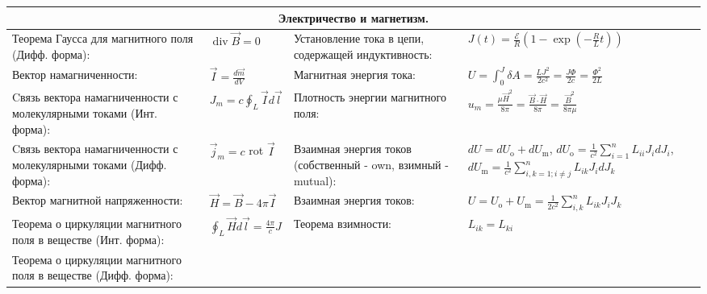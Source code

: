 \documentclass{article}
\begin{document}
\newpage

\begin{tabular}{ |p{6cm}|p{3.5cm}|p{6cm}|p{3.5cm}|  }
\hline
\multicolumn{4}{|c|}{Электричество и магнетизм.} \\
\hline
Теорема Гаусса для магнитного поля (Дифф. форма):                          &
$\operatorname{div} \vec{B}=0$                                             &
Установление тока в цепи, содержащей индуктивность:                        &
$J(t)=\frac{\mathcal{E}}{R}\left(1-\exp \left(-\frac{R}{L} t\right)\right)$ \\
\hline
Вектор намагниченности:                                                    &
$\vec{I}=\frac{d \vec{m}}{d V}$                                            &
Магнитная энергия тока:                                                    &
$U=\int_{0}^{J} \delta A=\frac{L J^{2}}{2 c^{2}}=\frac{J \Phi}{2 c}=\frac{\Phi^{2}}{2 L}$\\
\hline
Cвязь вектора намагниченности с молекулярными токами (Инт. форма):         &
$J_{m}=c \oint_{L} \vec{I} d {\vec l}$                                     &
Плотность энергии магнитного поля:                                         &
$u_{m}=\frac{\mu \vec{H}^{2}}{8 \pi}=\frac{\vec{B} \cdot \vec{H}}{8 \pi}=\frac{\vec{B}^{2}}{8 \pi \mu}$ \\
\hline
Cвязь вектора намагниченности с молекулярными токами (Дифф. форма):        &
$\vec{j}_{m}=c$ rot $\vec{I}$                                              &
Взаимная энергия токов (собственный - own, взимный - mutual):              &
$d U=d U_{\mathrm{o}}+d U_{\mathrm{m}}$,
$d U_{\mathrm{o}}=\frac{1}{c^{2}} \sum_{i=1}^{n} L_{i i} J_{i} d J_{i}$,
$d U_{\mathrm{m}}=\frac{1}{c^{2}} \sum_{i, k=1 ; i \neq j}^{n} L_{i k} J_{i} d J_{k}$\\
\hline
Вектор магнитной напряженности:                                            &
$\vec{H}=\vec{B} - 4 \pi \vec{I}$                                          &
Взаимная энергия токов:                                                    &
$U=U_{\mathrm{o}}+U_{\mathrm{m}}=\frac{1}{2 c^{2}} \sum_{i, k}^{n} L_{i k} J_{i} J_{k}$ \\
\hline
Теорема о циркуляции магнитного поля в веществе (Инт. форма):              &
$\oint_{L} \vec{H} d \vec{l}=\frac{4 \pi}{c} J$                            &
Теорема взимности:                                                         &
$L_{i k}=L_{k i}$                                                          \\
\hline
Теорема о циркуляции магнитного поля в веществе (Дифф. форма):             &

\end{tabular}
\end{document}
